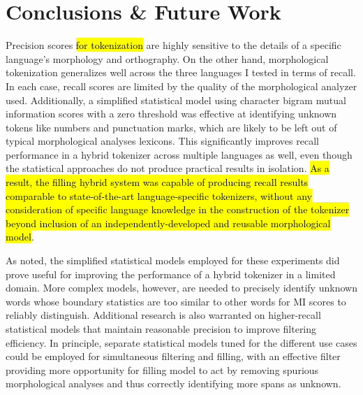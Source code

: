 \chapter{Conclusions \& Future Work}

Precision scores \hl{for tokenization} are highly sensitive to the details of a specific language's morphology and orthography. On the other hand, morphological tokenization generalizes well across the three languages I tested in terms of recall. In each case, recall scores are limited by the quality of the morphological analyzer used. Additionally, a simplified statistical model using character bigram mutual information scores with a zero threshold was effective at identifying unknown tokens like numbers and punctuation marks, which are likely to be left out of typical morphological analyses lexicons. This significantly improves recall performance in a hybrid tokenizer across multiple languages as well, even though the statistical approaches do not produce practical results in isolation. \hl{As a result, the filling hybrid system was capable of producing recall results comparable to state-of-the-art language-specific tokenizers, without any consideration of specific language knowledge in the construction of the tokenizer beyond inclusion of an independently-developed and reusable morphological model}.

As noted, the simplified statistical models employed for these experiments did prove useful for improving the performance of a hybrid tokenizer in a limited domain. More complex models, however, are needed to precisely identify unknown words whose boundary statistics are too similar to other words for MI scores to reliably distinguish. Additional research is also warranted on higher-recall statistical models that maintain reasonable precision to improve filtering efficiency. In principle, separate statistical models tuned for the different use cases could be employed for simultaneous filtering and filling, with an effective filter providing more opportunity for filling model to act by removing spurious morphological analyses and thus correctly identifying more spans as unknown.

